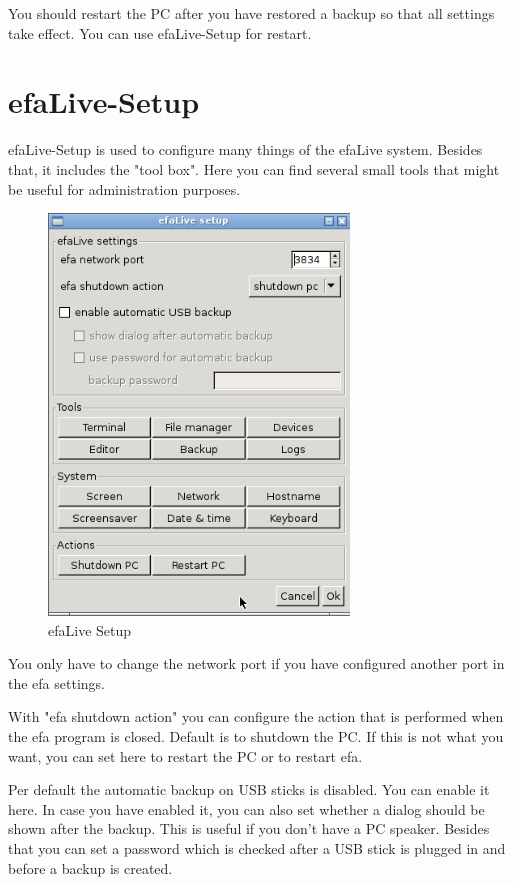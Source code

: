 \documentclass[a4paper,12pt,twoside]{article}
\begin{document}
You should restart the PC after you have restored a backup so that all
settings take effect. You can use efaLive-Setup for restart.


\section{efaLive-Setup}
\label{sct:efalivesetup}
efaLive-Setup is used to configure
many things of the efaLive system. Besides that, it includes the
"tool box". Here you can find several small
tools that might be useful for administration purposes.

\begin{figure}
    \centering
    \includegraphics[width=8cm]{efaLiveen-img/efaLive_efaLiveSetup_en.png}
    \caption{efaLive Setup}
    \label{fig:efalivesetup}
\end{figure}

You only have to change the network port
if you have configured another port in the efa settings.

With "efa shutdown action" you can configure
the action that is performed when the efa program is closed. Default is
to shutdown the PC. If this is not what you want, you can set here to
restart the PC or to restart efa.

Per default the automatic backup on USB sticks is disabled. You can
enable it here. In case you have enabled it, you can also set whether a
dialog should be shown after the backup. This is useful if you
don't have a PC speaker. Besides that you can set a password which is
checked after a USB stick is plugged in and before a backup is created.
\end{document}
